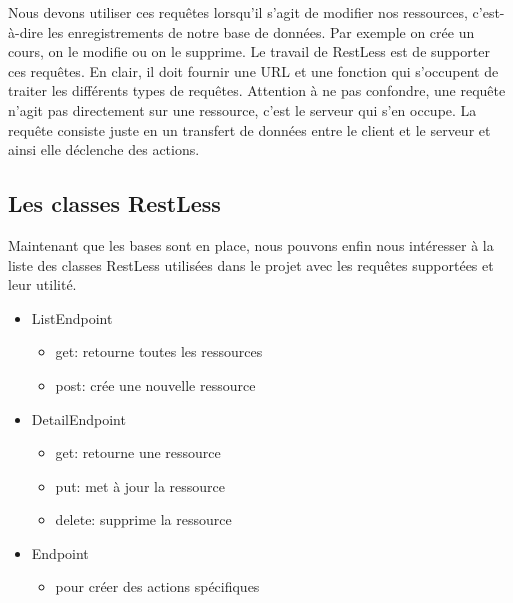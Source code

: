 \documentclass[letterpaper,10pt,oneside]{sphinxmanual}
\begin{document}
Nous devons utiliser ces requêtes lorsqu'il s'agit de modifier nos ressources, c'est-à-dire les enregistrements de notre base de données. Par exemple on crée un cours, on le modifie ou on le supprime. Le travail de RestLess est de supporter ces requêtes. En clair, il doit fournir une URL et une fonction qui s'occupent de traiter les différents types de requêtes. Attention à ne pas confondre, une requête n'agit pas directement sur une ressource, c'est le serveur qui s'en occupe. La requête consiste juste en un transfert de données entre le client et le serveur et ainsi elle déclenche des actions.


\subsection{Les classes RestLess}
\label{restless:les-classes-restless}
Maintenant que les bases sont en place, nous pouvons enfin nous intéresser à la liste des classes RestLess utilisées dans le projet avec les requêtes supportées et leur utilité.
\begin{itemize}
\item {} 
ListEndpoint
\begin{itemize}
\item {} 
get: retourne toutes les ressources

\item {} 
post: crée une nouvelle ressource

\end{itemize}

\item {} 
DetailEndpoint
\begin{itemize}
\item {} 
get: retourne une ressource

\item {} 
put: met à jour la ressource

\item {} 
delete: supprime la ressource

\end{itemize}

\item {} 
Endpoint
\begin{itemize}
\item {} 
pour créer des actions spécifiques

\end{itemize}

\end{itemize}
\end{document}
